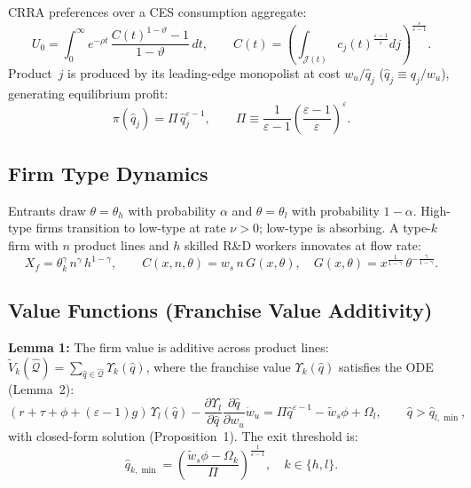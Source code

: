 CRRA preferences over a CES consumption aggregate:
\begin{equation}
  U_0 = \int_0^\infty e^{-\rho t}\,\frac{C(t)^{1-\vartheta}-1}{1-\vartheta}\,dt,
  \qquad C(t) = \left(\int_{\mathcal{J}(t)} c_j(t)^{\frac{\varepsilon-1}{\varepsilon}}dj\right)^{\frac{\varepsilon}{\varepsilon-1}}.
  \label{eq:ace_prefs}
\end{equation}
Product~$j$ is produced by its leading-edge monopolist at cost $w_u/\hat{q}_j$
($\hat{q}_j \equiv q_j/w_u$), generating equilibrium profit:
\begin{equation}
  \pi(\hat{q}_j) = \Pi\,\hat{q}_j^{\varepsilon-1}, \qquad
  \Pi \equiv \frac{1}{\varepsilon-1}\left(\frac{\varepsilon-1}{\varepsilon}\right)^\varepsilon.
  \label{eq:ace_profit}
\end{equation}

\subsection*{Firm Type Dynamics}

Entrants draw $\theta=\theta_h$ with probability $\alpha$ and $\theta=\theta_l$
with probability $1-\alpha$. High-type firms transition to low-type at rate
$\nu>0$; low-type is absorbing. A type-$k$ firm with $n$ product lines and
$h$ skilled R\&D workers innovates at flow rate:
\begin{equation}
  X_f = \theta_k^\gamma\, n^\gamma\, h^{1-\gamma}, \qquad
  C(x,n,\theta) = w_s\,n\,G(x,\theta), \quad
  G(x,\theta) = x^{\frac{1}{1-\gamma}}\,\theta^{-\frac{\gamma}{1-\gamma}}.
  \label{eq:ace_innovation}
\end{equation}

\subsection*{Value Functions (Franchise Value Additivity)}

\textbf{Lemma 1:} The firm value is additive across product lines:
$\tilde{V}_k(\hat{\mathcal{Q}}) = \sum_{\hat{q}\in\hat{\mathcal{Q}}}\Upsilon_k(\hat{q})$,
where the franchise value $\Upsilon_k(\hat{q})$ satisfies the ODE
(Lemma~2):
\begin{equation}
  (r+\tau+\phi+(\varepsilon-1)g)\,\Upsilon_l(\hat{q})
  - \frac{\partial\Upsilon_l}{\partial\hat{q}}\frac{\partial\hat{q}}{\partial w_u}\dot{w}_u
  = \Pi\hat{q}^{\varepsilon-1} - \tilde{w}_s\phi + \Omega_l,
  \qquad \hat{q}>\hat{q}_{l,\min},
  \label{eq:ace_bellman_low}
\end{equation}
with closed-form solution (Proposition~1). The exit threshold is:
\begin{equation}
  \hat{q}_{k,\min} = \left(\frac{\tilde{w}_s\phi - \Omega_k}{\Pi}\right)^{\frac{1}{\varepsilon-1}},
  \quad k\in\{h,l\}.
  \label{eq:ace_exit}
\end{equation}

